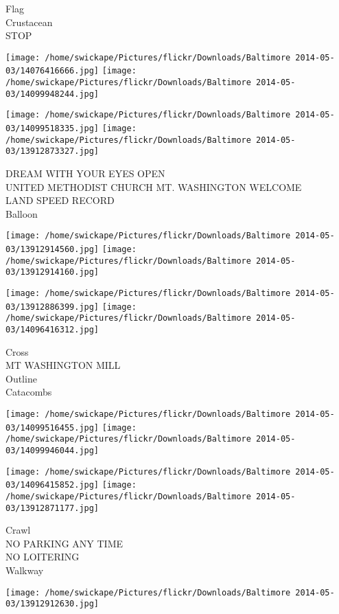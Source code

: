 \documentclass[10pt,letterpaper]{article}
\begin{document}
Flag\\
Crustacean\\
STOP
\pagebreak

\texttt{[image: /home/swickape/Pictures/flickr/Downloads/Baltimore 2014-05-03/14076416666.jpg]}
\texttt{[image: /home/swickape/Pictures/flickr/Downloads/Baltimore 2014-05-03/14099948244.jpg]}

\texttt{[image: /home/swickape/Pictures/flickr/Downloads/Baltimore 2014-05-03/14099518335.jpg]}
\texttt{[image: /home/swickape/Pictures/flickr/Downloads/Baltimore 2014-05-03/13912873327.jpg]}

DREAM WITH YOUR EYES OPEN\\
UNITED METHODIST CHURCH MT. WASHINGTON WELCOME\\
LAND SPEED RECORD\\
Balloon
\pagebreak

\texttt{[image: /home/swickape/Pictures/flickr/Downloads/Baltimore 2014-05-03/13912914560.jpg]}
\texttt{[image: /home/swickape/Pictures/flickr/Downloads/Baltimore 2014-05-03/13912914160.jpg]}

\texttt{[image: /home/swickape/Pictures/flickr/Downloads/Baltimore 2014-05-03/13912886399.jpg]}
\texttt{[image: /home/swickape/Pictures/flickr/Downloads/Baltimore 2014-05-03/14096416312.jpg]}

Cross\\
MT WASHINGTON MILL\\
Outline\\
Catacombs
\pagebreak

\texttt{[image: /home/swickape/Pictures/flickr/Downloads/Baltimore 2014-05-03/14099516455.jpg]}
\texttt{[image: /home/swickape/Pictures/flickr/Downloads/Baltimore 2014-05-03/14099946044.jpg]}

\texttt{[image: /home/swickape/Pictures/flickr/Downloads/Baltimore 2014-05-03/14096415852.jpg]}
\texttt{[image: /home/swickape/Pictures/flickr/Downloads/Baltimore 2014-05-03/13912871177.jpg]}

Crawl\\
NO PARKING ANY TIME\\
NO LOITERING\\
Walkway
\pagebreak

\texttt{[image: /home/swickape/Pictures/flickr/Downloads/Baltimore 2014-05-03/13912912630.jpg]}
\end{document}
